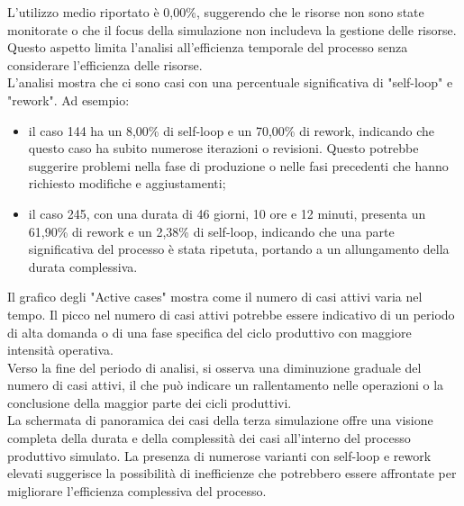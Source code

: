 \documentclass{article}
\begin{document}
L'utilizzo medio riportato è 0,00\%, suggerendo che le risorse non sono state monitorate o che il focus della simulazione non includeva la gestione delle risorse. Questo aspetto limita l'analisi all'efficienza temporale del processo senza considerare l'efficienza delle risorse.\\
L'analisi mostra che ci sono casi con una percentuale significativa di "self-loop" e "rework". Ad esempio:
\begin{itemize}
    \item il caso 144 ha un 8,00\% di self-loop e un 70,00\% di rework, indicando che questo caso ha subito numerose iterazioni o revisioni. Questo potrebbe suggerire problemi nella fase di produzione o nelle fasi precedenti che hanno richiesto modifiche e aggiustamenti;
    \item il caso 245, con una durata di 46 giorni, 10 ore e 12 minuti, presenta un 61,90\% di rework e un 2,38\% di self-loop, indicando che una parte significativa del processo è stata ripetuta, portando a un allungamento della durata complessiva.
\end{itemize}
Il grafico degli "Active cases" mostra come il numero di casi attivi varia nel tempo. Il picco nel numero di casi attivi potrebbe essere indicativo di un periodo di alta domanda o di una fase specifica del ciclo produttivo con maggiore intensità operativa.\\
Verso la fine del periodo di analisi, si osserva una diminuzione graduale del numero di casi attivi, il che può indicare un rallentamento nelle operazioni o la conclusione della maggior parte dei cicli produttivi.\\
La schermata di panoramica dei casi della terza simulazione offre una visione completa della durata e della complessità dei casi all'interno del processo produttivo simulato. La presenza di numerose varianti con self-loop e rework elevati suggerisce la possibilità di inefficienze che potrebbero essere affrontate per migliorare l'efficienza complessiva del processo.
\end{document}
